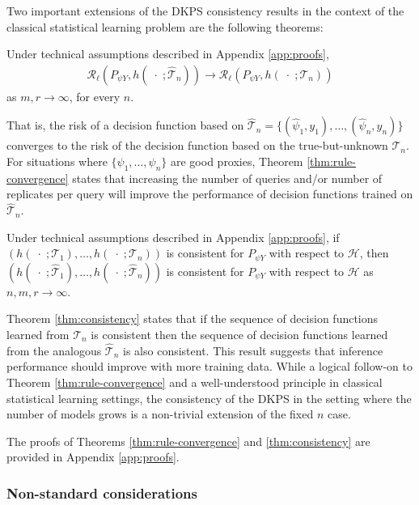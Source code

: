 Two important extensions of the DKPS consistency results in the context of the classical statistical learning problem are the following theorems:
\begin{theorem}
\label{thm:rule-convergence}
    Under technical assumptions described in Appendix \ref{app:proofs}, \begin{align*}
    \mathcal{R}_{\ell}(P_{\psi Y}, h(\; \cdot \;; \widehat{\mathcal{T}}_{n})) \to \mathcal{R}_{\ell}(P_{\psi Y}, h(\; \cdot \;; \mathcal{T}_{n})) 
    \end{align*} as $ m, r \to \infty $, for every $n$.
\end{theorem} That is, the risk of a decision function based on $\widehat{\mathcal{T}}_n=
\{
(\widehat{\psi}_1,y_1),\hdots ,
(\widehat{\psi}_n,y_n)
\}
$ converges to the risk of the decision function based on the true-but-unknown $ \mathcal{T}_{n} $.
For situations where $ \{\psi_{1}, \hdots, \psi_{n}\} $ are good proxies, Theorem \ref{thm:rule-convergence} states that increasing the number of queries and/or number of replicates per query will improve the performance of decision functions trained on $ \widehat{\mathcal{T}}_{n} $.
\begin{theorem}
\label{thm:consistency}
    Under technical assumptions described in Appendix \ref{app:proofs}, if $ (h(\; \cdot \;; \mathcal{T}_{1}), \hdots, h(\; \cdot \;; \mathcal{T}_{n})) $ is consistent for $ P_{\psi Y} $ with respect to
    $ \mathcal{H} $, then $ (h(\; \cdot \;; \widehat{\mathcal{T}}_{1}), \hdots, h(\; \cdot \;; \widehat{\mathcal{T}}_{n})) $ is consistent for 
    $ P_{\psi Y} $ 
    with respect to
    $ \mathcal{H} $ as $ n, m, r \to \infty $.
\end{theorem}
Theorem \ref{thm:consistency} states that if the sequence of decision functions learned from $ \mathcal{T}_{n} $ is consistent then the sequence of decision functions learned from the analogous $ \widehat{\mathcal{T}}_{n} $ is also consistent.
This result suggests that inference performance should improve with more training data.
While a logical follow-on to Theorem \ref{thm:rule-convergence} and a well-understood principle in classical statistical learning settings, the consistency of the DKPS in the setting where the number of models grows is a non-trivial extension of the fixed $ n $ case.

The proofs of Theorems \ref{thm:rule-convergence} and \ref{thm:consistency} are provided in Appendix \ref{app:proofs}.

\subsubsection{Non-standard considerations}
\label{subsec:non-standard-considerations}

